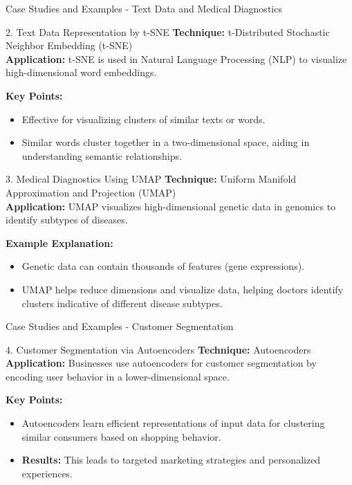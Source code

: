\documentclass[aspectratio=169]{beamer}
\begin{document}
\begin{frame}[fragile]{Case Studies and Examples - Text Data and Medical Diagnostics}
  \begin{block}{2. Text Data Representation by t-SNE}
    \textbf{Technique:} t-Distributed Stochastic Neighbor Embedding (t-SNE) \\
    \textbf{Application:} t-SNE is used in Natural Language Processing (NLP) to visualize high-dimensional word embeddings.
    
    \textbf{Key Points:}
    \begin{itemize}
      \item Effective for visualizing clusters of similar texts or words.
      \item Similar words cluster together in a two-dimensional space, aiding in understanding semantic relationships.
    \end{itemize}
  \end{block}

  \begin{block}{3. Medical Diagnostics Using UMAP}
    \textbf{Technique:} Uniform Manifold Approximation and Projection (UMAP) \\
    \textbf{Application:} UMAP visualizes high-dimensional genetic data in genomics to identify subtypes of diseases.
    
    \textbf{Example Explanation:}
    \begin{itemize}
      \item Genetic data can contain thousands of features (gene expressions).
      \item UMAP helps reduce dimensions and visualize data, helping doctors identify clusters indicative of different disease subtypes.
    \end{itemize}
  \end{block}
\end{frame}

\begin{frame}[fragile]{Case Studies and Examples - Customer Segmentation}
  \begin{block}{4. Customer Segmentation via Autoencoders}
    \textbf{Technique:} Autoencoders \\
    \textbf{Application:} Businesses use autoencoders for customer segmentation by encoding user behavior in a lower-dimensional space.
    
    \textbf{Key Points:}
    \begin{itemize}
      \item Autoencoders learn efficient representations of input data for clustering similar consumers based on shopping behavior.
      \item \textbf{Results:} This leads to targeted marketing strategies and personalized experiences.
    \end{itemize}
  \end{block}
\end{frame}
\end{document}
